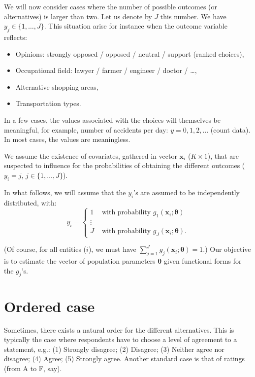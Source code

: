 \documentclass[
  12pt,
]{book}
\providecommand{\tightlist}{%
  \setlength{\itemsep}{0pt}\setlength{\parskip}{0pt}}
\theoremstyle{definition}
\theoremstyle{definition}
\theoremstyle{definition}
\theoremstyle{definition}
\theoremstyle{remark}
\begin{document}
We will now consider cases where the number of possible outcomes (or alternatives) is larger than two. Let us denote by \(J\) this number. We have \(y_j \in \{1,\dots,J\}\). This situation arise for instance when the outcome variable reflects:

\begin{itemize}
\tightlist
\item
  Opinions: strongly opposed / opposed / neutral / support (ranked choices),
\item
  Occupational field: lawyer / farmer / engineer / doctor / \ldots,
\item
  Alternative shopping areas,
\item
  Transportation types.
\end{itemize}

In a few cases, the values associated with the choices will themselves be meaningful, for example, number of accidents per day: \(y = 0, 1,2, \dots\) (count data). In most cases, the values are meaningless.

We assume the existence of covariates, gathered in vector \(\mathbf{x}_i\) (\(K \times 1\)), that are suspected to influence for the probabilities of obtaining the different outcomes (\(y_i=j\), \(j \in \{1,\dots,J\}\)).

In what follows, we will assume that the \(y_i\)'s are assumed to be independently distributed, with:
\begin{equation}
y_i = \left\{
\begin{array}{cl}
1 & \mbox{ with probability } g_1(\mathbf{x}_i;\boldsymbol\theta)\\
\vdots \\
J & \mbox{ with probability } g_J(\mathbf{x}_i;\boldsymbol\theta).
\end{array}
\right.\label{eq:generalMultiNom}
\end{equation}

(Of course, for all entities (\(i\)), we must have \(\sum_{j=1}^J g_j(\mathbf{x}_i;\boldsymbol\theta)=1\).) Our objective is to estimate the vector of population parameters \(\boldsymbol\theta\) given functional forms for the \(g_j\)'s.

\hypertarget{ordered-case}{%
\section{Ordered case}\label{ordered-case}}

Sometimes, there exists a natural order for the different alternatives. This is typically the case where respondents have to choose a level of agreement to a statement, e.g.: (1) Strongly disagree; (2) Disagree; (3) Neither agree nor disagree; (4) Agree; (5) Strongly agree. Another standard case is that of ratings (from A to F, say).
\end{document}
